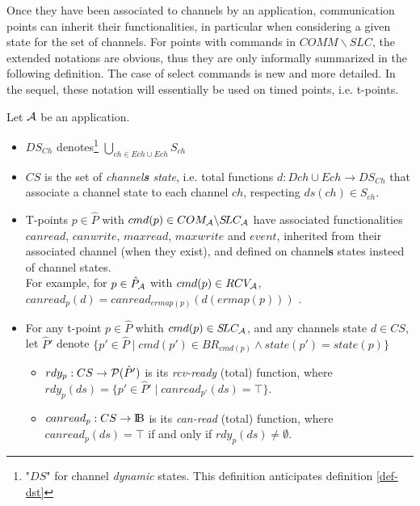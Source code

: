 \documentclass{article}
\newcommand{\BOOL}{\mbox{\normalfont I$\!$B}}
\begin{document}
Once they have been associated to channels by an application, communication points can inherit their functionalities, in particular when considering a given state for the set of channels. For points with commands in $COMM\backslash SLC$, the extended notations are obvious, thus they are only informally summari\-zed in the following definition. The case of select commands is new and more detailed. In the sequel, these notation will essentially be used on timed points, i.e. t-points. 
\begin{definition}\label{def-chfunc}Let ${\cal A}$ be an application.
\begin{itemize}
\item $DS_{Ch}$ denotes\footnote{"$DS$" for channel {\em dynamic} states. This definition anticipates definition \ref{def-dst}} $\bigcup_{ch\in Ech\cup Ech}S_{ch}$
\item $CS$ is the set of {\em channel{\bf s} state}, i.e. total functions $d:Dch\cup Ech\rightarrow DS_{Ch}$ that associate a channel state to each channel $ch$, respecting $ds(ch)\in S_{ch}$.
  \item T-points $p\in\hat P$ with $cmd(p)\in COM_{\cal A}\backslash S\!LC_{\cal A}$ have associated functionalities $canread$, $canwrite$, $maxread$, $maxwrite$ and $event$, inherited from their associated channel (when they exist), and defined on channel{\bf s} states insteed of channel states.\\
  For example, for $p\in \hat P_{\cal A}$ with $cmd(p)\in RCV_{\cal A}$, $canread_{p}(d)=canread_{ermap(p)}(d(ermap(p)))$ .
	\vspace{0.5mm}\item For any t-point $p\in\hat P$ whith $cmd(p)\in S\!LC_{\cal A}$, and any channels state $d\in CS$,\\
	 let $\hat P'$ denote $\{p'\in\hat P\mid cmd(p')\in BR_{cmd(p)}\wedge state(p')=state(p)\}$
  \begin{itemize}
	  \item $rdy_p:CS\rightarrow{\cal P}(\hat P')$ is its  {\em rcv-ready} (total) function, where\\ $rdy_p(ds)=\{p'\in\hat P'\mid canread_{p'}(ds)=\top\}$.
	  \item $canread_p:CS\rightarrow\BOOL$ is its  {\em can-read} (total) function, where\\ $canread_p(ds)=\top$ if and only if $rdy_{p}(ds)\neq\emptyset$.
	\end{itemize}
\end{itemize}
\end{definition}
\end{document}
